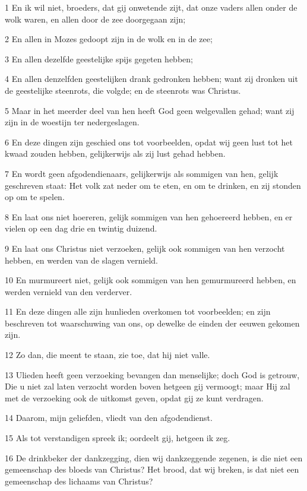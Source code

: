 \par 1 En ik wil niet, broeders, dat gij onwetende zijt, dat onze vaders allen onder de wolk waren, en allen door de zee doorgegaan zijn;
\par 2 En allen in Mozes gedoopt zijn in de wolk en in de zee;
\par 3 En allen dezelfde geestelijke spijs gegeten hebben;
\par 4 En allen denzelfden geestelijken drank gedronken hebben; want zij dronken uit de geestelijke steenrots, die volgde; en de steenrots was Christus.
\par 5 Maar in het meerder deel van hen heeft God geen welgevallen gehad; want zij zijn in de woestijn ter nedergeslagen.
\par 6 En deze dingen zijn geschied ons tot voorbeelden, opdat wij geen lust tot het kwaad zouden hebben, gelijkerwijs als zij lust gehad hebben.
\par 7 En wordt geen afgodendienaars, gelijkerwijs als sommigen van hen, gelijk geschreven staat: Het volk zat neder om te eten, en om te drinken, en zij stonden op om te spelen.
\par 8 En laat ons niet hoereren, gelijk sommigen van hen gehoereerd hebben, en er vielen op een dag drie en twintig duizend.
\par 9 En laat ons Christus niet verzoeken, gelijk ook sommigen van hen verzocht hebben, en werden van de slagen vernield.
\par 10 En murmureert niet, gelijk ook sommigen van hen gemurmureerd hebben, en werden vernield van den verderver.
\par 11 En deze dingen alle zijn hunlieden overkomen tot voorbeelden; en zijn beschreven tot waarschuwing van ons, op dewelke de einden der eeuwen gekomen zijn.
\par 12 Zo dan, die meent te staan, zie toe, dat hij niet valle.
\par 13 Ulieden heeft geen verzoeking bevangen dan menselijke; doch God is getrouw, Die u niet zal laten verzocht worden boven hetgeen gij vermoogt; maar Hij zal met de verzoeking ook de uitkomst geven, opdat gij ze kunt verdragen.
\par 14 Daarom, mijn geliefden, vliedt van den afgodendienst.
\par 15 Als tot verstandigen spreek ik; oordeelt gij, hetgeen ik zeg.
\par 16 De drinkbeker der dankzegging, dien wij dankzeggende zegenen, is die niet een gemeenschap des bloeds van Christus? Het brood, dat wij breken, is dat niet een gemeenschap des lichaams van Christus?
